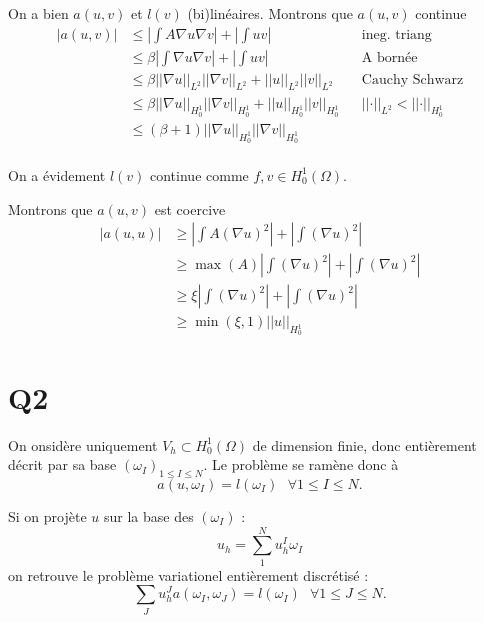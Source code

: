 \documentclass[11pt]{article}
\newcommand{\ms}{~~~}
\newcommand{\norm}[1]{\left|\left|#1\right|\right|}
\begin{document}
On a bien $a(u,v)$ et $l(v)$ (bi)linéaires. Montrons que $a(u,v)$ continue 
\begin{align}
  \label{eq:ac}
  |a(u,v)| &\leq \left| \int A \nabla u \nabla v \right| + \left| \int u v \right| && \mbox{ineg. triang} \\
           &\leq \beta \left| \int \nabla u \nabla v \right| + \left| \int u v \right| && \mbox{A bornée} \\
           &\leq \beta \norm{\nabla u}_{L^2} \norm{\nabla v}_{L^2} + \norm{u}_{L^2}\norm{v}_{L^2} && \mbox{Cauchy Schwarz} \\
           &\leq \beta \norm{\nabla u}_{H^1_0} \norm{\nabla v}_{H^1_0} + \norm{u}_{H^1_0}\norm{v}_{H^1_0} && \norm{\cdot}_{L^2}<\norm{\cdot}_{H^1_0} \\
           &\leq (\beta+1) \norm{\nabla u}_{H^1_0} \norm{\nabla v}_{H^1_0}   \\
\end{align}

On a évidement $l(v)$ continue comme $f, v \in H^1_0(\Omega)$. 

Montrons que $a(u,v)$ est coercive
\begin{align}
  \label{eq:co}
  |a(u,u)| &\geq \left|\int A (\nabla u)^2 \right| + \left|\int (\nabla u)^2 \right| \\
           &\geq \max(A) \left|\int (\nabla u)^2 \right| + \left|\int (\nabla u)^2 \right| \\
           &\geq \xi \left|\int (\nabla u)^2 \right| + \left|\int (\nabla u)^2 \right| \\
           &\geq \min(\xi,1) \norm{u}_{H^1_0}
\end{align}

\section{Q2}

On onsidère uniquement $V_h \subset H^1_0(\Omega)$ de dimension finie, donc entièrement décrit par sa base $(\omega_I)_{1\leq I \leq N}$. Le problème se ramène donc à
\begin{equation}
  a(u,\omega_I) = l(\omega_I) \ms \forall 1\leq I\leq N.
\end{equation}

Si on projète $u$ sur la base des $(\omega_I)$ :
\begin{equation}
  u_h = \sum_{1}^{N} u_h^I \omega_I
\end{equation}
on retrouve le problème variationel entièrement discrétisé :
\begin{equation}
  \sum_J u_h^J a(\omega_I, \omega_J) = l(\omega_I) \ms \forall  1\leq J\leq N.   
\end{equation}
\end{document}
